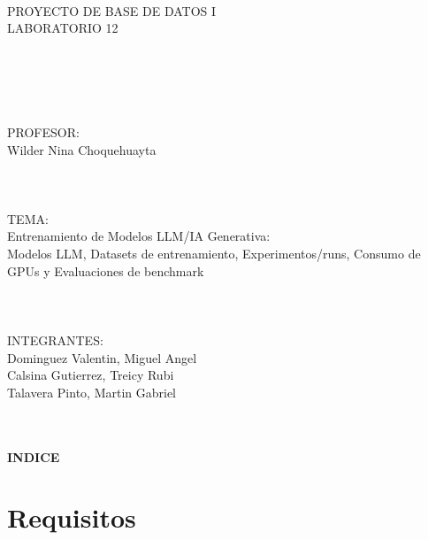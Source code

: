 \documentclass[12pt,a4paper]{article}
\begin{document}
\begin{titlepage}
\centering\fontsize{14}{18}\selectfont
\mbox{} \\
\mbox{} \\
\mbox{} \\
\mbox{} \\
\mbox{} \\
\mbox{} \\
\mbox{} \\
\mbox{} \\
PROYECTO DE BASE DE DATOS I \\
LABORATORIO 12 \\
\mbox{} \\
\mbox{} \\
\mbox{} \\
\mbox{} \\
\mbox{} \\
PROFESOR: \\
Wilder Nina Choquehuayta \\
\mbox{} \\
\mbox{} \\
\mbox{} \\
TEMA: \\
Entrenamiento de Modelos LLM/IA Generativa: \\
Modelos LLM, Datasets de entrenamiento, Experimentos/runs, Consumo de GPUs y Evaluaciones de benchmark \\
\mbox{} \\
\mbox{} \\
\mbox{} \\
INTEGRANTES: \\
Dominguez Valentin, Miguel Angel \\
Calsina Gutierrez, Treicy Rubi \\
Talavera Pinto, Martin Gabriel \\
\mbox{} \\
\mbox{} \\
\mbox{}
\end{titlepage}

\begin{center}\textbf{INDICE}\end{center}
\vspace{0.5\baselineskip}
\tableofcontents
\newpage

\section{Requisitos}
\end{document}

